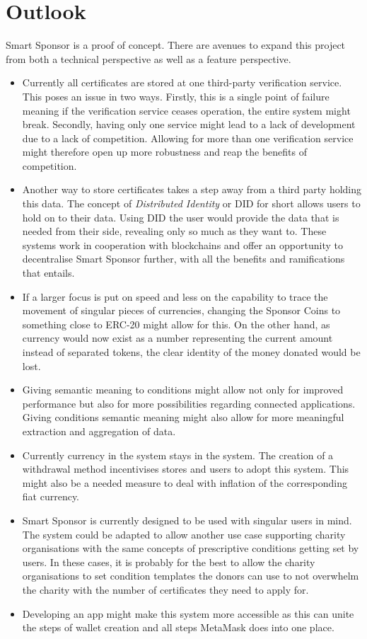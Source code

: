 \section{Outlook}
Smart Sponsor is a proof of concept. There are avenues to expand this project from both a technical perspective as well as a feature perspective.
\begin{itemize}
    \item Currently all certificates are stored at one third-party verification service. This poses an issue in two ways. Firstly, this is a single point of failure meaning if the verification service ceases operation, the entire system might break. Secondly, having only one service might lead to a lack of development due to a lack of competition. Allowing for more than one verification service might therefore open up more robustness and reap the benefits of competition.
    \item Another way to store certificates takes a step away from a third party holding this data. The concept of \emph{Distributed Identity} or DID for short allows users to hold on to their data\cite{DID}. Using DID the user would provide the data that is needed from their side, revealing only so much as they want to. These systems work in cooperation with blockchains and offer an opportunity to decentralise Smart Sponsor further, with all the benefits and ramifications that entails.
    \item If a larger focus is put on speed and less on the capability to trace the movement of singular pieces of currencies, changing the Sponsor Coins to something close to ERC-20 might allow for this. On the other hand, as currency would now exist as a number representing the current amount instead of separated tokens, the clear identity of the money donated would be lost.
    \item Giving semantic meaning to conditions might allow not only for improved performance but also for more possibilities regarding connected applications. Giving conditions semantic meaning might also allow for more meaningful extraction and aggregation of data.
    \item Currently currency in the system stays in the system. The creation of a withdrawal method incentivises stores and users to adopt this system. This might also be a needed measure to deal with inflation of the corresponding fiat currency.
    \item Smart Sponsor is currently designed to be used with singular users in mind. The system could be adapted to allow another use case supporting charity organisations with the same concepts of prescriptive conditions getting set by users. In these cases, it is probably for the best to allow the charity organisations to set condition templates the donors can use to not overwhelm the charity with the number of certificates they need to apply for.
    \item Developing an app might make this system more accessible as this can unite the steps of wallet creation and all steps MetaMask does into one place.
\end{itemize}